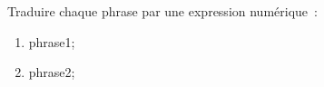 \documentclass[exercice]{thedocument}%
\begin{document}
%
Traduire chaque phrase par une expression numérique~:\par\vskip10pt
\begin{enumerate}
    \item \<phrase1;
    \item \<phrase2;
\end{enumerate}
\end{document}
